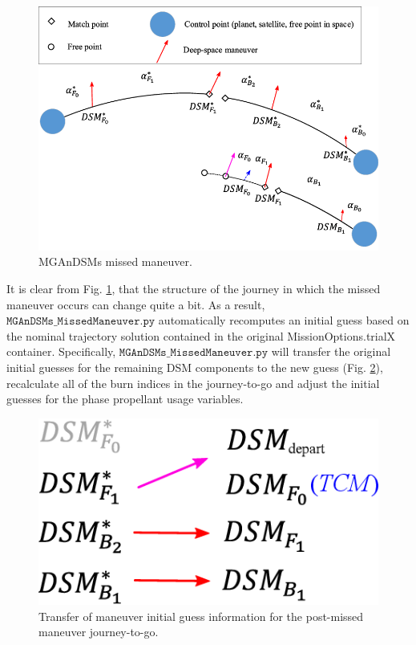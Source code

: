 \documentclass[11pt]{article}
\begin{document}
\begin{figure}[h!]
	\centering
	\includegraphics*[clip, trim=0.0cm 0.0cm 0.0cm 0.0cm, width=1.0\linewidth]{MGAnDSMsphase_Missed_Maneuver.png}
	\caption{\label{fig:MGAnDSMs_missed_maneuver} MGAnDSMs missed maneuver.}
\end{figure}

It is clear from Fig. \ref{fig:MGAnDSMs_missed_maneuver}, that the structure of the journey in which the missed maneuver occurs can change quite a bit. As a result, $\mathtt{MGAnDSMs\_MissedManeuver.py}$ automatically recomputes an initial guess based on the nominal trajectory solution contained in the original MissionOptions.trialX container. Specifically, $\mathtt{MGAnDSMs\_MissedManeuver.py}$ will transfer the original initial guesses for the remaining DSM components to the new guess (Fig. \ref{fig:ManeuverList}), recalculate all of the burn indices in the journey-to-go and adjust the initial guesses for the phase propellant usage variables.

\begin{figure}[H]
	\centering
	\includegraphics*[clip, trim=0.0cm 0.0cm 0.0cm 0.0cm, width=0.8\linewidth]{ManeuverList.png}
	\caption{\label{fig:ManeuverList} Transfer of maneuver initial guess information for the post-missed maneuver journey-to-go.}
\end{figure}
\end{document}
